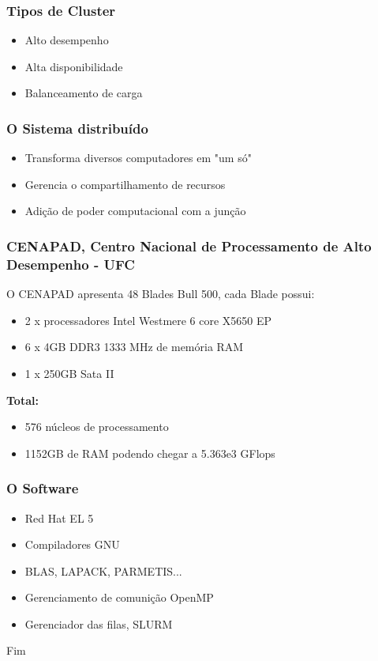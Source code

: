 \documentclass{beamer}
\begin{document}
\begin{frame}
    \frametitle{Tipos de Cluster}

\begin{itemize}
    \item Alto desempenho
    \item Alta disponibilidade
    \item Balanceamento de carga
\end{itemize}

\end{frame}

\begin{frame}
    \frametitle{O Sistema distribuído}

\begin{itemize}
    \item Transforma diversos computadores em "um só"
    \item Gerencia o compartilhamento de recursos
    \item Adição de poder computacional com a junção
\end{itemize}
\end{frame}

\begin{frame}
    \frametitle{CENAPAD, Centro Nacional de Processamento de Alto Desempenho - UFC}
    
    O CENAPAD apresenta 48 Blades Bull 500, cada Blade possui:
    \begin{itemize}
        \item 2 x processadores Intel Westmere 6 core X5650 EP
        \item 6 x 4GB DDR3 1333 MHz de memória RAM
        \item 1 x 250GB Sata II
    \end{itemize}

    \textbf{Total:}
    \begin{itemize}
        \item 576 núcleos de processamento
        \item 1152GB de RAM podendo chegar a 5.363e3 GFlops
    \end{itemize}
\end{frame}

\begin{frame}
    \frametitle{O Software}
    \begin{itemize}
        \item Red Hat EL 5
        \item Compiladores GNU
        \item BLAS, LAPACK, PARMETIS...
        \item Gerenciamento de comunição OpenMP
        \item Gerenciador das filas, SLURM
    \end{itemize}
\end{frame}

\begin{frame}
\Huge{\centerline{Fim}}
\end{frame}
\end{document}
